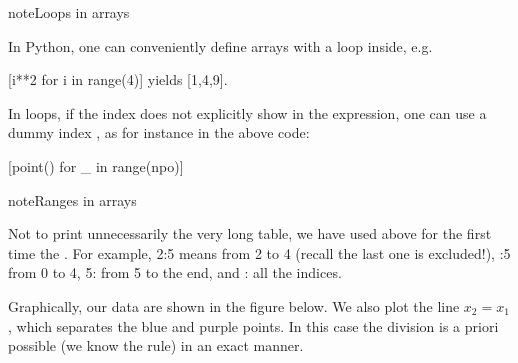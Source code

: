 \documentclass[letterpaper,10pt,english]{jupyterBook}
\begin{document}
\begin{sphinxadmonition}{note}{Loops in arrays}

\sphinxAtStartPar
In Python, one can conveniently define arrays with a loop inside, e.g.

\sphinxAtStartPar
{[}i**2 for i in range(4){]} yields {[}1,4,9{]}.

\sphinxAtStartPar
In loops, if the index does not explicitly show in the expression, one can use a dummy index \sphinxstylestrong{\_}, as for instance in the above code:

\sphinxAtStartPar
{[}point() for \_ in range(npo){]}
\end{sphinxadmonition}

\begin{sphinxadmonition}{note}{Ranges in arrays}

\sphinxAtStartPar
Not to print unnecessarily the very long table, we have used above for the first time the . For example, 2:5 means from 2 to 4 (recall the last one is excluded!), :5  \sphinxhyphen{} from 0 to 4, 5: \sphinxhyphen{} from 5 to the end, and : \sphinxhyphen{} all the indices.
\end{sphinxadmonition}

\sphinxAtStartPar
Graphically, our data are shown in the figure below. We also plot the line \(x_2=x_1\), which separates the blue and purple points. In this case the division is a priori possible (we know the rule) in an exact manner.
\end{document}
